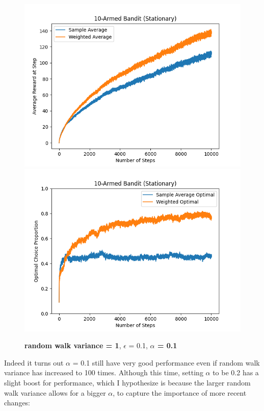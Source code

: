 \documentclass{article}
\begin{document}
\begin{figure}[h!]
\centering
\includegraphics[scale=.6]{RL_A1_pics/alpha/walk1alpha0.1.png}
\includegraphics[scale=.6]{RL_A1_pics/alpha/optimal/walk1alpha0.1.png}
\caption{\textbf{random walk variance = 1}, $\epsilon$ = 0.1, \textbf{$\alpha$ = 0.1}}
\label{fig:10-Armed1}
\end{figure}

\newpage
Indeed it turns out $\alpha$ = 0.1 still have very good performance even if random walk variance has increased to 100 times. Although this time, setting $\alpha$ to be 0.2 has a slight boost for performance, which I hypothesize is because the larger random walk variance allows for a bigger $\alpha$, to capture the importance of more recent changes:
\end{document}

